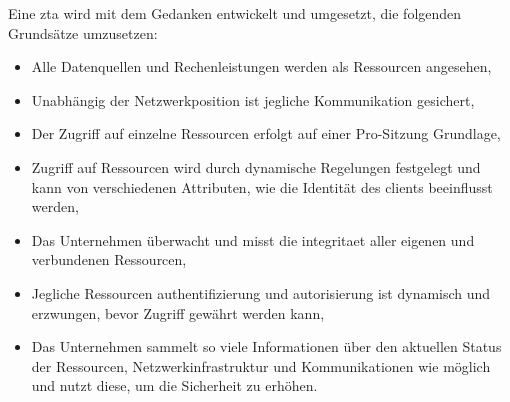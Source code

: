 Eine \ac{zta} wird mit dem Gedanken entwickelt und umgesetzt, die folgenden Grundsätze umzusetzen:
\begin{itemize}
    \item Alle Datenquellen und Rechenleistungen werden als Ressourcen angesehen,
    \item Unabhängig der Netzwerkposition ist jegliche Kommunikation gesichert,
    \item Der Zugriff auf einzelne Ressourcen erfolgt auf einer Pro-Sitzung Grundlage,
    \item Zugriff auf Ressourcen wird durch dynamische Regelungen festgelegt und kann von verschiedenen Attributen, wie die Identität des \glspl{client} beeinflusst werden,
    \item Das Unternehmen überwacht und misst die \gls{integritaet} aller eigenen und verbundenen Ressourcen,
    \item Jegliche Ressourcen \gls{authentifizierung} und \gls{autorisierung} ist dynamisch und erzwungen, bevor Zugriff gewährt werden kann,
    \item Das Unternehmen sammelt so viele Informationen über den aktuellen Status der Ressourcen, Netzwerkinfrastruktur und Kommunikationen wie möglich und nutzt diese, um die Sicherheit zu erhöhen.\autocite[\vglf][-7]{NIST:800207}
\end{itemize}
